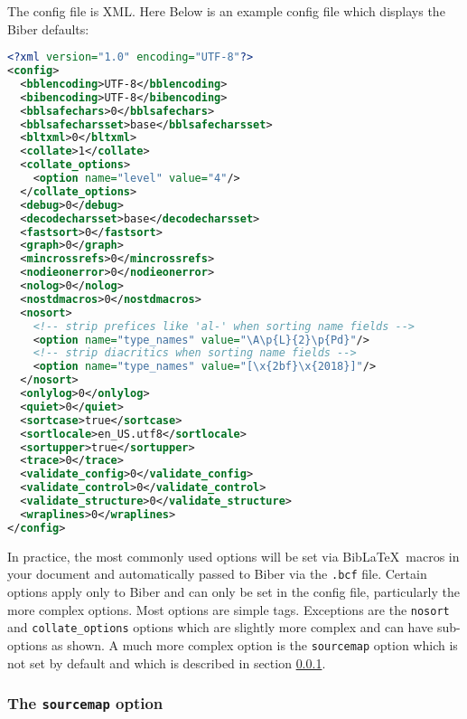 \documentclass{ltxdockit}
\begin{document}
\noindent The config file is XML. Here Below is
an example config file which displays the Biber defaults:

\begin{lstlisting}[language=xml]
<?xml version="1.0" encoding="UTF-8"?>
<config>
  <bblencoding>UTF-8</bblencoding>
  <bibencoding>UTF-8</bibencoding>
  <bblsafechars>0</bblsafechars>
  <bblsafecharsset>base</bblsafecharsset>
  <bltxml>0</bltxml>
  <collate>1</collate>
  <collate_options>
    <option name="level" value="4"/>
  </collate_options>
  <debug>0</debug>
  <decodecharsset>base</decodecharsset>
  <fastsort>0</fastsort>
  <graph>0</graph>
  <mincrossrefs>0</mincrossrefs>
  <nodieonerror>0</nodieonerror>
  <nolog>0</nolog>
  <nostdmacros>0</nostdmacros>
  <nosort>
    <!-- strip prefices like 'al-' when sorting name fields -->
    <option name="type_names" value="\A\p{L}{2}\p{Pd}"/>
    <!-- strip diacritics when sorting name fields -->
    <option name="type_names" value="[\x{2bf}\x{2018}]"/>
  </nosort>
  <onlylog>0</onlylog>
  <quiet>0</quiet>
  <sortcase>true</sortcase>
  <sortlocale>en_US.utf8</sortlocale>
  <sortupper>true</sortupper>
  <trace>0</trace>
  <validate_config>0</validate_config>
  <validate_control>0</validate_control>
  <validate_structure>0</validate_structure>
  <wraplines>0</wraplines>
</config>
\end{lstlisting}

\noindent In practice, the most commonly used options will be set via
Bib\LaTeX\ macros in your document and automatically passed to Biber
via the \verb+.bcf+ file. Certain options apply only to Biber and can
only be set in the config file, particularly the more complex
options. Most options are simple tags. Exceptions are the
\verb+nosort+ and \verb+collate_options+ options which are slightly
more complex and can have sub-options as shown. A much more complex
option is the \verb+sourcemap+ option which is not set by default and
which is described in section \ref{map}.

\subsubsection{The \texttt{sourcemap} option}\label{map}
\end{document}
